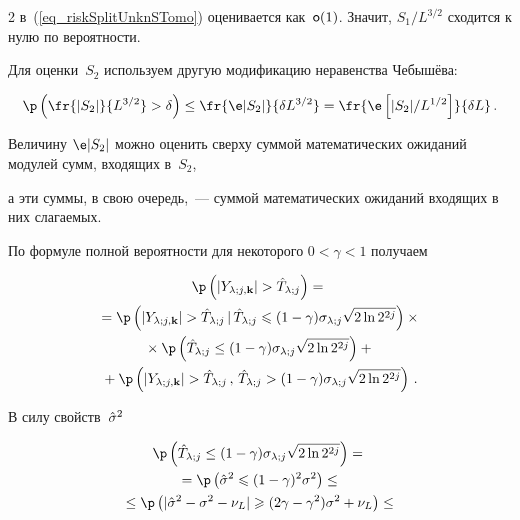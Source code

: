 \begin{multicols}{2}
в~(\ref{eq_riskSplitUnknSTomo}) оценивается как~$\textsf{o}(1)$. Значит, $S_1/L^{3/2}$ сходится к нулю по вероятности.





Для оценки~$S_2$ используем другую модификацию неравенства Чебышёва:


\begin{equation*}


\p\left( \fr{|S_2|}{L^{3/2}} > \delta \right) \leq \fr{\e|S_2|}{\delta L^{3/2}} = 


\fr{\e\left[|S_2|/L^{1/2}\right]}{\delta L}\,.


\end{equation*}


Величину $\e|S_2|$ можно оценить сверху суммой математических ожиданий модулей сумм, входящих в~$S_2$, 


а эти суммы, в свою очередь,~--- суммой математических ожиданий входящих в них слагаемых.





По формуле полной вероятности для некоторого $0<\gamma<1$ получаем


\begin{multline*}


\p\left( |\Yljk| > \hTlj \right)={}\\


{}=\p\left( |\Yljk| > \hTlj \,|\, \hTlj \leqslant (1-\gamma)\solj\sqrt{2\ln 2^{2j}} \right)\times{}\\


{}\times \p\left( \hTlj \leq (1-\gamma)\solj\sqrt{2\ln 2^{2j}} \right) + {}\\


{}+ \p\left( |\Yljk| > \hTlj \,,\, \hTlj > (1-\gamma)\solj\sqrt{2\ln 2^{2j}} \right)\,.


\end{multline*}


В силу свойств~$\hat\sigma^2$


\begin{multline*}


\p\left( \hTlj \leq (1-\gamma)\solj\sqrt{2\ln 2^{2j}} \right)={}\\


{}=\p\left(\hsig\leqslant (1-\gamma)^2\sigma^2\right)\leq{}\\


{}\leq\p\left(|\hsig-\sigma^2-\nu_L|\geqslant(2\gamma-\gamma^2)\sigma^2+\nu_L\right)\leq{}\\



\end{multline*}
\end{multicols}
